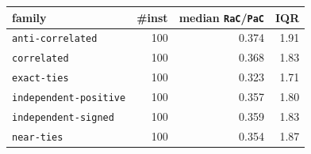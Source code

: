\begin{tabular}{@{}lrrr@{}}
\toprule
family & \#inst & median \texttt{RaC}/\texttt{PaC} & IQR \\
\midrule
\texttt{anti-correlated} & 100 & 0.374 & 1.91 \\
\texttt{correlated} & 100 & 0.368 & 1.83 \\
\texttt{exact-ties} & 100 & 0.323 & 1.71 \\
\texttt{independent-positive} & 100 & 0.357 & 1.80 \\
\texttt{independent-signed} & 100 & 0.359 & 1.83 \\
\texttt{near-ties} & 100 & 0.354 & 1.87 \\
\bottomrule
\end{tabular}
